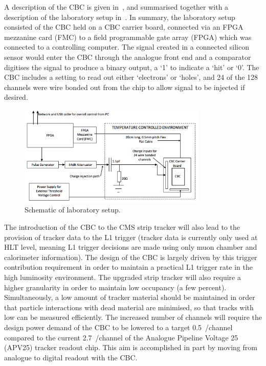 A description of the CBC is given in~\cite{JonesL}, and summarised together with a description of the
laboratory setup in~\cite{JacobJA}. In summary, the laboratory setup consisted of the CBC held on a CBC
carrier board, connected via an FPGA mezzanine card (FMC) to a field programmable gate array (FPGA) which was
connected to a controlling computer. The signal created in a connected silicon sensor would enter the CBC
through the analogue front end and a comparator digitises the signal to produce a binary output, a `1' to
indicate a `hit' or `0'. The CBC includes a setting to read out either `electrons' or `holes', and 24 of the
128 channels were wire bonded out from the chip to allow signal to be injected if desired. %

\begin{figure}[ht] %
   \centering
     \includegraphics[width=0.8\textwidth]{Chapters/07_Appendices/07c_2_Images/lab_setup_schematic}\hfill
     \caption{Schematic of laboratory setup.}
     \label{fig:lab_setup_schematic}
\end{figure}

The introduction of the CBC to the CMS strip tracker will also lead to the provision of tracker data to the L1
trigger (tracker data is currently only used at HLT level, meaning L1 trigger decisions are made using only
muon chamber and calorimeter information). The design of the CBC is largely driven by this trigger
contribution requirement in order to maintain a practical L1 trigger rate in the high luminosity environment.
The upgraded strip tracker will also require a higher granularity in order to maintain low occupancy (a few
percent). Simultaneously, a low amount of tracker material should be maintained in order that particle
interactions with dead material are minimised, so that tracks with low \pt can be measured efficiently. The
increased number of channels will require the design power demand of the CBC to be lowered to a target
0.5~\mW/channel~\cite{JonesL,Ferguson:2012cg,Raymond:2012zz} compared to the current 2.7~\mW/channel of
the Analogue Pipeline Voltage 25 (APV25) tracker readout chip. This aim is accomplished in part by moving
from analogue to digital readout with the CBC.

